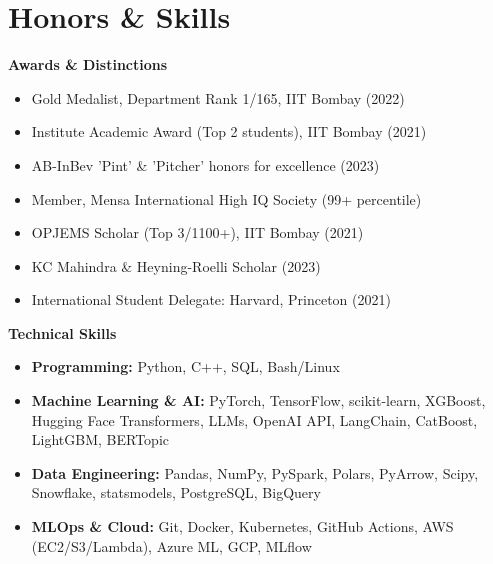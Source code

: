 \documentclass[letterpaper,10pt]{article}
\begin{document}
\section{Honors \& Skills}
{\small
\begin{multicols}{2}

{\vspace{-4pt}\scshape\raggedright\large\bfseries Awards \& Distinctions}
\begin{itemize}[leftmargin=0.15in, itemsep=-2pt]
  \item Gold Medalist, Department Rank 1/165, IIT Bombay (2022)
  \item Institute Academic Award (Top 2 students), IIT Bombay (2021)
  \item AB-InBev 'Pint' \& 'Pitcher' honors for excellence (2023)
  \item Member, Mensa International High IQ Society (99+ percentile)
  \item OPJEMS Scholar (Top 3/1100+), IIT Bombay (2021)
  \item KC Mahindra \& Heyning-Roelli Scholar  (2023)
  \item International Student Delegate: Harvard, Princeton (2021)
\end{itemize}

\columnbreak

{\vspace{-4pt}\scshape\raggedright\large\bfseries Technical Skills}
\begin{itemize}[leftmargin=0.15in]
  \item \textbf{Programming:} Python, C++, SQL, Bash/Linux 
  \item \textbf{Machine Learning \& AI:} PyTorch, TensorFlow, scikit-learn, XGBoost, Hugging Face Transformers, LLMs, OpenAI API, LangChain, CatBoost, LightGBM, BERTopic
  \item \textbf{Data Engineering:} Pandas, NumPy, PySpark, Polars, PyArrow, Scipy, Snowflake, statsmodels, PostgreSQL, BigQuery
  \item \textbf{MLOps \& Cloud:} Git, Docker, Kubernetes, GitHub Actions, AWS (EC2/S3/Lambda), Azure ML, GCP, MLflow
\end{itemize}
\end{multicols}
}

\vspace{-16pt}
\end{document}
